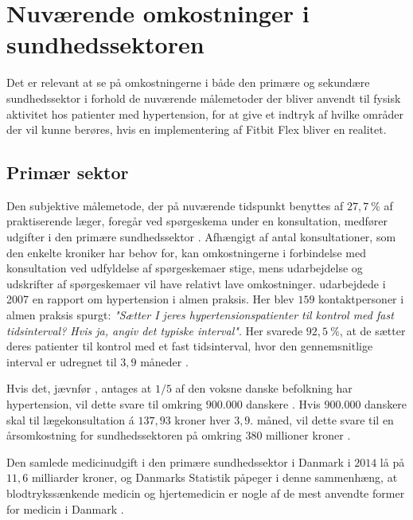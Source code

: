 \section{Nuværende omkostninger i sundhedssektoren}
Det er relevant at se på omkostningerne i både den primære og sekundære sundhedssektor i forhold de nuværende målemetoder der bliver anvendt til fysisk aktivitet hos patienter med hypertension, for at give et indtryk af hvilke områder der vil kunne berøres, hvis en implementering af Fitbit Flex bliver en realitet. 

\subsection{Primær sektor} \label{sec:nuv_primaer}
\label{sec:primaer_sektor_omkostninger}
Den subjektive målemetode, der på nuværende tidspunkt benyttes af $27,7~\%$ af praktiserende læger, foregår ved spørgeskema under en konsultation, medfører udgifter i den primære sundhedssektor \citep{munck2007}. Afhængigt af antal konsultationer, som den enkelte kroniker har behov for, kan omkostningerne i forbindelse med konsultation ved udfyldelse af spørgeskemaer stige, mens udarbejdelse og udskrifter af spørgeskemaer vil have relativt lave omkostninger.
\citeauthor{munck2007} udarbejdede i 2007 en rapport om hypertension i almen praksis. Her blev $159$ kontaktpersoner i almen praksis spurgt: \textit{"Sætter I jeres hypertensionspatienter til kontrol med fast tidsinterval? Hvis ja, angiv det typiske interval"}. Her svarede $92,5~\%$, at de sætter deres patienter til kontrol med et fast tidsinterval, hvor den gennemsnitlige interval er udregnet til $3,9$ måneder \citep{munck2007}. 

Hvis det, jævnfør \citeauthor{kronborg2008}, antages at $1/5$ af den voksne danske befolkning har hypertension, vil dette svare til omkring $900.000$ danskere \citep{folketal2016}. Hvis $900.000$ danskere skal til lægekonsultation á $137,93$ kroner hver $3,9$. måned, vil dette svare til en årsomkostning for sundhedssektoren på omkring $380$ millioner kroner \citep{honorartabel2016}. 

Den samlede medicinudgift i den primære sundhedssektor i Danmark i $2014$ lå på $11,6$ milliarder kroner, og Danmarks Statistik påpeger i denne sammenhæng, at blodtrykssænkende medicin og hjertemedicin er nogle af de mest anvendte former for medicin i Danmark \citep{dst2016}. 

